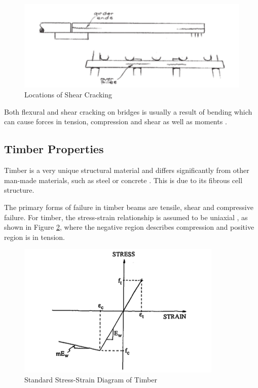 \documentclass[11pt,a4paper]{article}
\numberwithin{equation}{subsection}
\begin{document}
	\begin{figure}[h]
 		\begin{center}
 			\includegraphics[scale=0.8]{Shear_Failure}
 		\end{center}
 		\caption{Locations of Shear Cracking \cite{_timber_2005}}
 		\label{fig:Shear}
 	\end{figure}
   \noindent 
   Both flexural and shear cracking on bridges is usually a result of bending which can cause forces in tension, compression and shear as well as moments \cite{ritter_timber_1990}. 

\subsection{Timber Properties}
    Timber is a very unique structural material and differs significantly from other man-made materials, such as steel or concrete \cite{plevris_frp-reinforced_1992}. This is due to its fibrous cell structure.
	
	\vspace*{\baselineskip}	
	
	 \noindent
	 The primary forms of failure in timber beams are tensile, shear and compressive failure. For timber, the stress-strain relationship is assumed to be uniaxial \cite{bazan_ultimate_1980,buchanan_combined_1986}, as shown in Figure \ref{fig:Stress-Strain}, where the negative region describes compression and positive region is in tension.
	 
	\begin{figure}[h]
  		\begin{center}
  			\includegraphics[scale=0.9]{Stress_Strain_Wood}
  		\end{center}
  		\caption{Standard Stress-Strain Diagram of Timber \cite{plevris_frp-reinforced_1992}}
  		\label{fig:Stress-Strain}
  	\end{figure}
	 
\end{document}
